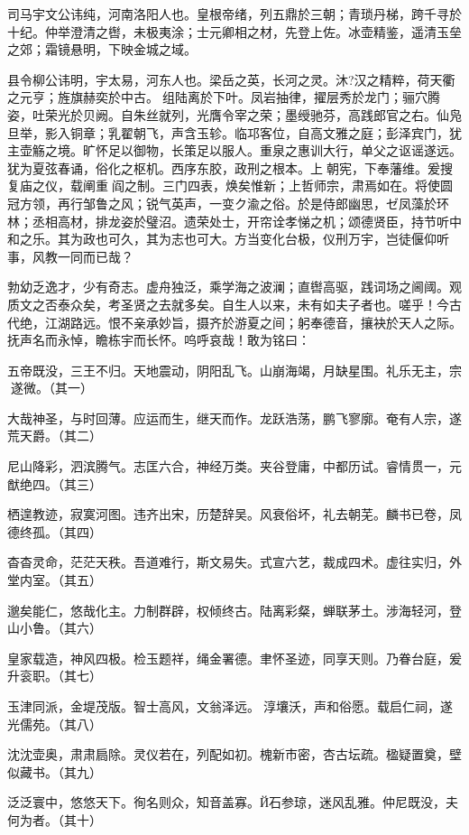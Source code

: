 \documentclass[UTF8,titlepage,oneside]{ctexbook}
\begin{document}
司马宇文公讳纯，河南洛阳人也。皇根帝绪，列五鼎於三朝；青琐丹梯，跨千寻於十纪。仲举澄清之辔，未极夷涂；士元卿相之材，先登上佐。冰壶精鉴，遥清玉垒之郊；霜镜悬明，下映金城之域。


县令柳公讳明，宇太易，河东人也。梁岳之英，长河之灵。沐?汉之精粹，荷天衢之元亨；旌旗赫奕於中古。组陆离於下叶。凤岩抽律，擢层秀於龙门；骊穴腾姿，吐荣光於贝阙。自朱丝就列，光膺令宰之荣；墨绶驰芬，高践郎官之右。仙凫旦举，影入铜章；乳翟朝飞，声含玉轸。临邛客位，自高文雅之庭；彭泽宾门，犹主壶觞之境。旷怀足以御物，长策足以服人。重泉之惠训大行，单父之讴谣遂远。犹为夏弦春诵，俗化之枢机。西序东胶，政刑之根本。上朝宪，下奉藩维。爰搜复庙之仪，载阐重阎之制。三门四表，焕矣惟新；上哲师宗，肃焉如在。将使圆冠方领，再行邹鲁之风；锐气英声，一变ク渝之俗。於是侍郎幽思，ゼ凤藻於环林；丞相高材，排龙姿於璧沼。遗荣处士，开帘诠孝悌之机；颂德贤臣，持节听中和之乐。其为政也可久，其为志也可大。方当变化台极，仪刑万宇，岂徒偃仰听事，风教一同而已哉？


勃幼乏逸才，少有奇志。虚舟独泛，乘学海之波澜；直辔高驱，践词场之阃阈。观质文之否泰众矣，考圣贤之去就多矣。自生人以来，未有如夫子者也。嗟乎！今古代绝，江湖路远。恨不亲承妙旨，摄齐於游夏之间；躬奉德音，攘袂於天人之际。抚声名而永悼，瞻栋宇而长怀。呜呼哀哉！敢为铭曰：

五帝既没，三王不归。天地震动，阴阳乱飞。山崩海竭，月缺星围。礼乐无主，宗遂微。（其一）

大哉神圣，与时回薄。应运而生，继天而作。龙跃浩荡，鹏飞寥廓。奄有人宗，遂荒天爵。（其二）

尼山降彩，泗滨腾气。志匡六合，神经万类。夹谷登庸，中都历试。睿情贯一，元猷绝四。（其三）

栖遑教迹，寂寞河图。违齐出宋，历楚辞吴。风衰俗坏，礼去朝芜。麟书已卷，凤德终孤。（其四）

杳杳灵命，茫茫天秩。吾道难行，斯文易失。式宣六艺，裁成四术。虚往实归，外堂内室。（其五）

邈矣能仁，悠哉化主。力制群辟，权倾终古。陆离彩粲，蝉联茅土。涉海轻河，登山小鲁。（其六）

皇家载造，神风四极。检玉题祥，绳金署德。聿怀圣迹，同享天则。乃眷台庭，爰升衮职。（其七）

玉津同派，金堤茂版。智士高风，文翁泽远。淳壤沃，声和俗愿。载启仁祠，遂光儒苑。（其八）

沈沈壶奥，肃肃扃除。灵仪若在，列配如初。槐新市密，杏古坛疏。楹疑置奠，壁似藏书。（其九）

泛泛寰中，悠悠天下。徇名则众，知音盖寡。Й石参琼，迷风乱雅。仲尼既没，夫何为者。（其十）
\end{document}
